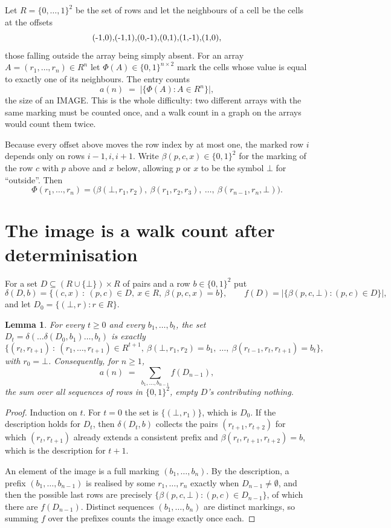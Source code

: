 \documentclass[11pt,a4paper]{article}
\theoremstyle{plain}
\newtheorem{lemma}[theorem]{Lemma}
\theoremstyle{definition}
\begin{document}
Let $R=\{0,\dots,1\}^{2}$ be the set of rows and let the neighbours of a cell be the
cells at the offsets
\[
$(-1,0)$, $(-1,1)$, $(0,-1)$, $(0,1)$, $(1,-1)$, $(1,0)$,
\]
those falling outside the array being simply absent. For an array
$A=(r_1,\dots,r_n)\in R^n$ let $\Phi(A)\in\{0,1\}^{n\times2}$ mark the cells whose value
is equal to exactly one of its neighbours. The entry counts
\[
a(n)\;=\;\bigl|\{\Phi(A):A\in R^n\}\bigr| ,
\]
the size of an IMAGE. This is the whole difficulty: two different arrays with the same marking
must be counted once, and a walk count in a graph on the arrays would count them twice.

Because every offset above moves the row index by at most one, the marked row $i$ depends only
on rows $i-1,i,i+1$. Write $\beta(p,c,x)\in\{0,1\}^{2}$ for the marking of the row $c$
with $p$ above and $x$ below, allowing $p$ or $x$ to be the symbol $\bot$ for ``outside''.
Then
\[
\Phi(r_1,\dots,r_n)=\bigl(\beta(\bot,r_1,r_2),\ \beta(r_1,r_2,r_3),\ \dots,\
\beta(r_{n-1},r_n,\bot)\bigr).
\]

\section{The image is a walk count after determinisation}

For a set $D\subseteq(R\cup\{\bot\})\times R$ of pairs and a row $b\in\{0,1\}^{2}$ put
\[
\delta(D,b)=\{(c,x)\ :\ (p,c)\in D,\ x\in R,\ \beta(p,c,x)=b\},\qquad
f(D)=\bigl|\{\beta(p,c,\bot):(p,c)\in D\}\bigr| ,
\]
and let $D_0=\{(\bot,r):r\in R\}$.

\begin{lemma}\label{lem:det}
For every $t\ge0$ and every $b_1,\dots,b_t$, the set
$D_t=\delta(\dots\delta(D_0,b_1)\dots,b_t)$ is exactly
\[
\{(r_t,r_{t+1})\ :\ (r_1,\dots,r_{t+1})\in R^{t+1},\ \beta(\bot,r_1,r_2)=b_1,\ \dots,\
\beta(r_{t-1},r_t,r_{t+1})=b_t\} ,
\]
with $r_0=\bot$. Consequently, for $n\ge1$,
\[
a(n)\;=\;\sum_{b_1,\dots,b_{n-1}}f(D_{n-1}),
\]
the sum over all sequences of rows in $\{0,1\}^{2}$, empty $D$'s contributing nothing.
\end{lemma}

\begin{proof}
Induction on $t$. For $t=0$ the set is $\{(\bot,r_1)\}$, which is $D_0$. If the description
holds for $D_t$, then $\delta(D_t,b)$ collects the pairs $(r_{t+1},r_{t+2})$ for which
$(r_t,r_{t+1})$ already extends a consistent prefix and
$\beta(r_t,r_{t+1},r_{t+2})=b$, which is the description for $t+1$.

An element of the image is a full marking $(b_1,\dots,b_n)$. By the description, a prefix
$(b_1,\dots,b_{n-1})$ is realised by some $r_1,\dots,r_n$ exactly when $D_{n-1}\neq
\emptyset$, and then the possible last rows are precisely
$\{\beta(p,c,\bot):(p,c)\in D_{n-1}\}$, of which there are $f(D_{n-1})$. Distinct
sequences $(b_1,\dots,b_n)$ are distinct markings, so summing $f$ over the prefixes counts the
image exactly once each.
\end{proof}
\end{document}
